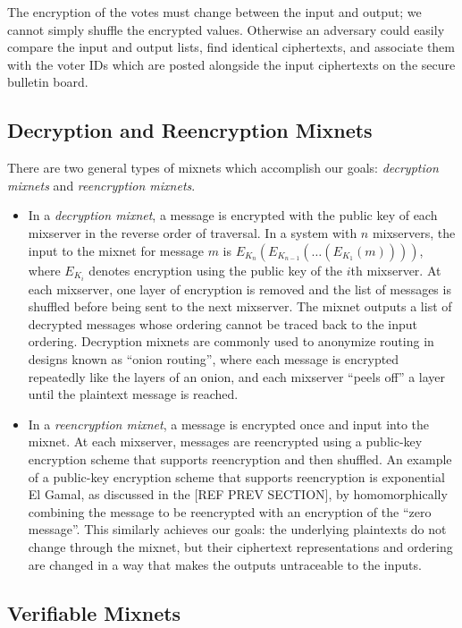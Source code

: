 The encryption of the votes must change between the input and output; we cannot simply shuffle the encrypted values. Otherwise an adversary could easily compare the input and output lists, find identical ciphertexts, and associate them with the voter IDs which are posted alongside the input ciphertexts on the secure bulletin board.

\subsection{Decryption and Reencryption Mixnets}

There are two general types of mixnets which accomplish our goals: \emph{decryption mixnets} and \emph{reencryption mixnets}.
\begin{itemize}
\item In a \emph{decryption mixnet}, a message is encrypted with the public key of each mixserver in the reverse order of traversal. In a system with $n$ mixservers, the input to the mixnet for message $m$ is $E_{K_n}(E_{K_{n-1}}( \dots (E_{K_1}(m))))$, where $E_{K_i}$ denotes encryption using the public key of the $i$th mixserver. At each mixserver, one layer of encryption is removed and the list of messages is shuffled before being sent to the next mixserver. The mixnet outputs a list of decrypted messages whose ordering cannot be traced back to the input ordering. Decryption mixnets are commonly used to anonymize routing in designs known as ``onion routing'', where each message is encrypted repeatedly like the layers of an onion, and each mixserver ``peels off'' a layer until the plaintext message is reached.
\item In a \emph{reencryption mixnet}, a message is encrypted once and input into the mixnet. At each mixserver, messages are reencrypted using a public-key encryption scheme that supports reencryption and then shuffled. An example of a public-key encryption scheme that supports reencryption is exponential El Gamal, as discussed in the [REF PREV SECTION], by homomorphically combining the message to be reencrypted with an encryption of the ``zero message''. This similarly achieves our goals: the underlying plaintexts do not change through the mixnet, but their ciphertext representations and ordering are changed in a way that makes the outputs untraceable to the inputs.
\end{itemize}

\subsection{Verifiable Mixnets}

